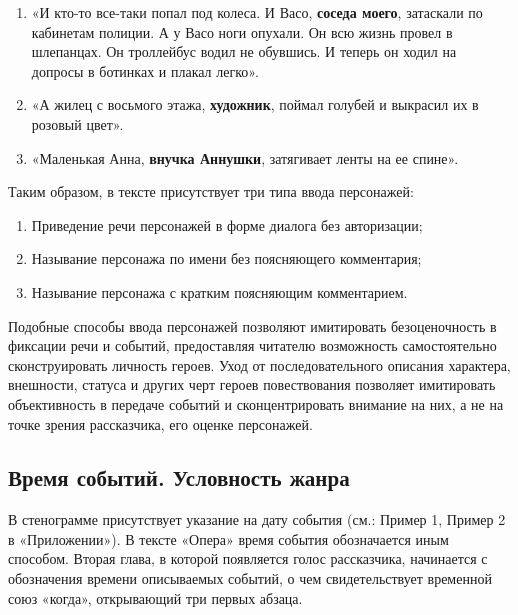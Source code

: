 \documentclass{kursa4}
\begin{document}
{        \begin{enumerate}
          \item «И кто-то все-таки попал под колеса. И Васо, \textbf{соседа
          моего}, затаскали по кабинетам полиции. А у Васо ноги опухали. Он всю
          жизнь провел в шлепанцах. Он троллейбус водил не обувшись. И теперь он
          ходил на допросы в ботинках и плакал легко».
          \item «А жилец с восьмого этажа, \textbf{художник}, поймал голубей и
          выкрасил их в розовый цвет».
          \item «Маленькая Анна, \textbf{внучка Аннушки}, затягивает ленты на ее
          спине».
        \end{enumerate}

        Таким образом, в тексте присутствует три типа ввода персонажей: 

        \begin{enumerate}
          \item Приведение речи персонажей в форме диалога без авторизации;
          \item Называние персонажа по имени без поясняющего комментария;
          \item Называние персонажа с кратким поясняющим комментарием.
        \end{enumerate}

        Подобные способы ввода персонажей позволяют имитировать
        безоценочность в фиксации речи и событий, предоставляя читателю
        возможность самостоятельно сконструировать личность героев. Уход от
        последовательного описания характера, внешности, статуса и других черт
        героев повествования позволяет имитировать объективность в передаче
        событий и сконцентрировать внимание на них, а не на точке зрения
        рассказчика, его оценке персонажей. 

      \subsection{Время событий. Условность жанра}

        В стенограмме присутствует указание на дату события (см.: Пример
        1, Пример 2 в «Приложении»). В тексте «Опера» время события
        обозначается иным способом. Вторая глава, в которой появляется голос
        рассказчика, начинается с обозначения времени описываемых событий, о
        чем свидетельствует временной союз «когда», открывающий три первых
        абзаца. 

}
\end{document}
